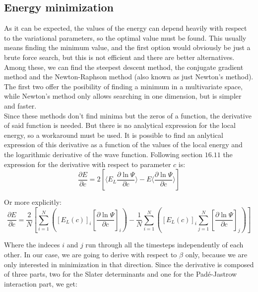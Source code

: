 	\subsection{Energy minimization}
		As it can be expected, the values of the energy can depend heavily with respect to the variational parameters, so the optimal value must be found. This usually means finding the minimum value, and the first option would obviously be just a brute force search, but this is not efficient and there are better alternatives. Among these, we can find the steepest descent method, the conjugate gradient method and the Newton-Raphson method (also known as just Newton's method). The first two offer the posibility of finding a minimum in a multivariate space, while Newton's method only allows searching in one dimension, but is simpler and faster.\\

		Since these methods don't find minima but the zeros of a function, the derivative of said function is needed. But there is no analytical expression for the local energy, so a workaround must be used. It is possible to find an anlytical expression of this derivative as a function of the values of the local energy and the logarithmic derivative of the wave function. Following \parencite{mortens_notes} section $16.11$ the expression for the derivative with respect to parameter $c$ is:\\

		\begin{equation}\frac{\partial E}{\partial c}=2\left[\langle E_L\frac{\partial\ln{\Psi}}{\partial c}\rangle-E\langle\frac{\partial\ln{\Psi}}{\partial c}\rangle\right]\end{equation}

		Or more explicitly:\\

		\begin{equation}\frac{\partial E}{\partial c}=\frac{2}{N}\left[\sum_{i=1}^N\left(\left[E_L\left(c\right)\right]_i\left[\frac{\partial\ln{\Psi}}{\partial c}\right]_i\right)-\frac{1}{N}\sum_{i=1}^N\left(\left[E_L\left(c\right)\right]_i\sum_{j=1}^N\left[\frac{\partial\ln{\Psi}}{\partial c}\right]_j\right)\right]\end{equation}

		Where the indeces $i$ and $j$ run through all the timesteps independently of each other. In our case, we are going to derive with respect to $\beta$ only, because we are only interested in minimization in that direction. Since the derivative is composed of three parts, two for the Slater determinants and one for the Padé-Jastrow interaction part, we get:\\

